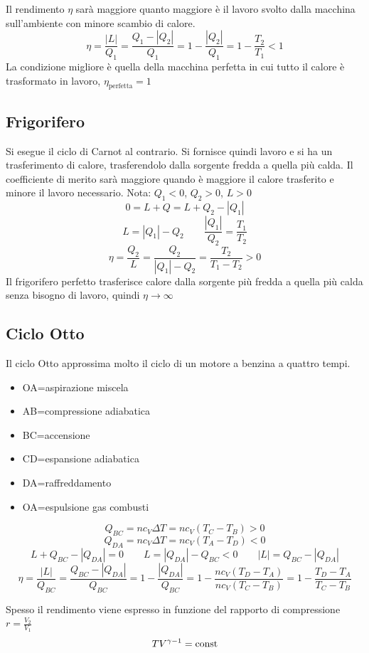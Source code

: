 Il rendimento $\eta$ sarà maggiore quanto maggiore è il lavoro svolto dalla macchina sull'ambiente con minore scambio di calore.
\[\eta=\frac{|L|}{Q_1}=\frac{Q_1-|Q_2|}{Q_1}=1-\frac{|Q_2|}{Q_1}=1-\frac{T_2}{T_1}<1\]
La condizione migliore è quella della macchina perfetta in cui tutto il calore è trasformato in lavoro, $\eta_\text{perfetta}= 1$

\subsection{Frigorifero}
Si esegue il ciclo di Carnot al contrario. Si fornisce quindi lavoro e si ha un trasferimento di calore, trasferendolo dalla sorgente fredda a quella più calda.
Il coefficiente di merito sarà maggiore quando è maggiore il calore trasferito e minore il lavoro necessario.
Nota: $Q_1<0$, $Q_2>0$, $L>0$
\[0=L+Q=L+Q_2-|Q_1|\]
\[L=|Q_1|-Q_2\qquad\frac{|Q_1|}{Q_2}=\frac{T_1}{T_2}\]
\[\eta=\frac{Q_2}{L}=\frac{Q_2}{|Q_1|-Q_2}=\frac{T_2}{T_1-T_2}>0\]
Il frigorifero perfetto trasferisce calore dalla sorgente più fredda a quella più calda senza bisogno di lavoro, quindi $\eta\rightarrow\infty$

\subsection{Ciclo Otto}
Il ciclo Otto approssima molto il ciclo di un motore a benzina a quattro tempi.
\begin{itemize}
   \item[] OA=aspirazione miscela
   \item[] AB=compressione adiabatica
   \item[] BC=accensione
   \item[] CD=espansione adiabatica
   \item[] DA=raffreddamento
   \item[] OA=espulsione gas combusti
\end{itemize}

\[Q_{BC}=nc_V\Delta T=nc_V(T_C-T_B)>0\]
\[Q_{DA}=nc_V\Delta T=nc_V(T_A-T_D)<0\]
\[L+Q_{BC}-|Q_{DA}|=0 \qquad L=|Q_{DA}|-Q_{BC}<0\qquad |L|=Q_{BC}-|Q_{DA}|\]
\[\eta=\frac{|L|}{Q_{BC}}=\frac{Q_{BC}-|Q_{DA}|}{Q_{BC}}=1-\frac{|Q_{DA}|}{Q_{BC}}=1-\frac{nc_V(T_D-T_A)}{nc_V(T_C-T_B)}=1-\frac{T_D-T_A}{T_C-T_B}\]

Spesso il rendimento viene espresso in funzione del rapporto di compressione $r=\frac{V_2}{V_1}$
\[TV^{\gamma-1}=\text{const}\]

